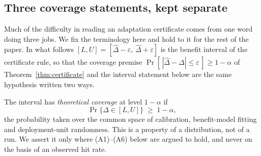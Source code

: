 
\subsection{Three coverage statements, kept separate}\label{sec:three-coverages}

Much of the difficulty in reading an adaptation certificate comes from one word doing
three jobs. We fix the terminology here and hold to it for the rest of the paper. In
what follows $[L,U]=[\widehat\Delta-\varepsilon,\ \widehat\Delta+\varepsilon]$ is the
benefit interval of the certificate rule, so that the coverage premise
$\Pr[\,|\widehat\Delta-\Delta|\le\varepsilon\,]\ge1-\alpha$ of
Theorem~\ref{thm:certificate} and the interval statement below are the same hypothesis
written two ways.

\begin{definition}\label{def:cov-theoretical}
The interval has \emph{theoretical coverage} at level $1-\alpha$ if
\begin{equation}\label{eq:cov-theoretical}
  \Pr\bigl\{\Delta \in [L,U]\bigr\} \;\ge\; 1-\alpha ,
\end{equation}
the probability taken over the common space of calibration, benefit-model fitting and
deployment-unit randomness. This is a property of a distribution, not of a run. We
assert it only where (A1)--(A6) below are argued to hold, and never on the basis of an
observed hit rate.
\end{definition}

